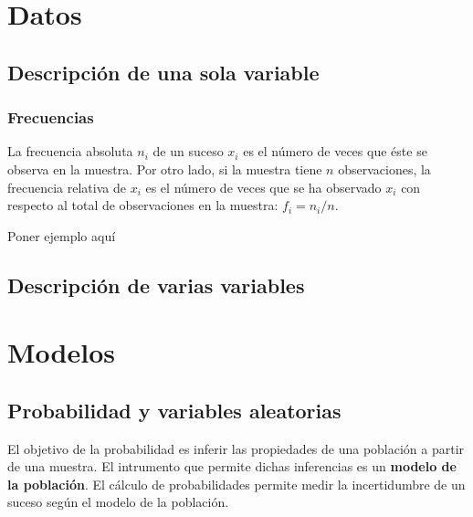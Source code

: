 \section{Datos}
\subsection{Descripción de una sola variable}
\subsubsection{Frecuencias}
La frecuencia absoluta $n_i$ de un suceso $x_i$ es el número de veces que éste se observa en la muestra. Por otro lado, si la muestra tiene $n$ observaciones, la frecuencia relativa de $x_i$ es el número de veces que se ha observado $x_i$ con respecto al total de observaciones en la muestra: $f_i = n_i/n$.
\begin{example}
Poner ejemplo aquí
\end{example}
\subsection{Descripción de varias variables}
\section{Modelos}
\subsection{Probabilidad y variables aleatorias}
El objetivo de la probabilidad es inferir las propiedades de una población a partir de una muestra. El intrumento que permite dichas inferencias es un \textbf{modelo de la población}. El cálculo de probabilidades permite medir la incertidumbre de un suceso según el modelo de la población.
